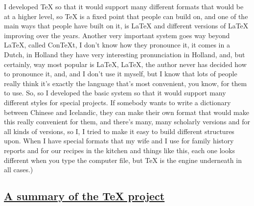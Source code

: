 \documentclass[]{article}
\begin{document}
I developed TeX so that it would support many different formats that
would be at a higher level, so TeX is a fixed point that people can
build on, and one of the main ways that people have built on it, is
LaTeX and different versions of LaTeX improving over the years. Another
very important system goes way beyond LaTeX, called ConTeXt, I don't
know how they pronounce it, it comes in a Dutch, in Holland they have
very interesting pronunciation in Holland, and, but certainly, way most
popular is LaTeX, LaTeX, the author never has decided how to pronounce
it, and, and I don't use it myself, but I know that lots of people
really think it's exactly the language that's most convenient, you know,
for them to use. So, so I developed the basic system so that it would
support many different styles for special projects. If somebody wants to
write a dictionary between Chinese and Icelandic, they can make their
own format that would make this really convenient for them, and there's
many, many scholarly versions and for all kinds of versions, so I, I
tried to make it easy to build different structures upon. When I have
special formats that my wife and I use for family history reports and
for our recipes in the kitchen and things like this, each one looks
different when you type the computer file, but TeX is the engine
underneath in all cases.)

\subsection{\texorpdfstring{\href{http://webofstories.com/play/17129}{A
summary of the TeX
project}}{A summary of the TeX project}}\label{a-summary-of-the-tex-project}
\end{document}
